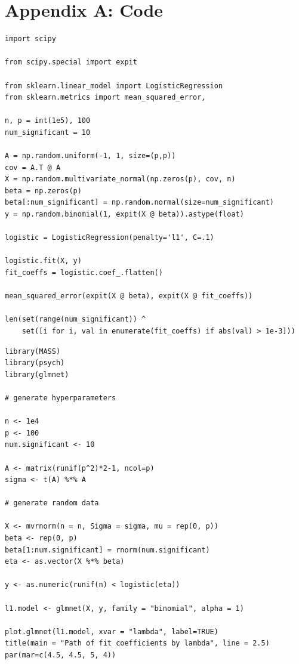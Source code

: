 \documentclass[letterpaper, 12pt]{article}
\begin{document}
\newpage

\section*{Appendix A: Code}

\begin{lstlisting}
import scipy

from scipy.special import expit

from sklearn.linear_model import LogisticRegression
from sklearn.metrics import mean_squared_error, 

n, p = int(1e5), 100
num_significant = 10

A = np.random.uniform(-1, 1, size=(p,p))
cov = A.T @ A
X = np.random.multivariate_normal(np.zeros(p), cov, n)
beta = np.zeros(p)
beta[:num_significant] = np.random.normal(size=num_significant)
y = np.random.binomial(1, expit(X @ beta)).astype(float)

logistic = LogisticRegression(penalty='l1', C=.1)

logistic.fit(X, y)
fit_coeffs = logistic.coef_.flatten()

mean_squared_error(expit(X @ beta), expit(X @ fit_coeffs))

len(set(range(num_significant)) ^ 
    set([i for i, val in enumerate(fit_coeffs) if abs(val) > 1e-3]))
\end{lstlisting}

\begin{lstlisting}
library(MASS)
library(psych)
library(glmnet)

# generate hyperparameters

n <- 1e4
p <- 100
num.significant <- 10

A <- matrix(runif(p^2)*2-1, ncol=p) 
sigma <- t(A) %*% A

# generate random data

X <- mvrnorm(n = n, Sigma = sigma, mu = rep(0, p))
beta <- rep(0, p)
beta[1:num.significant] = rnorm(num.significant)
eta <- as.vector(X %*% beta)

y <- as.numeric(runif(n) < logistic(eta))

l1.model <- glmnet(X, y, family = "binomial", alpha = 1)

plot.glmnet(l1.model, xvar = "lambda", label=TRUE)
title(main = "Path of fit coefficients by lambda", line = 2.5)
par(mar=c(4.5, 4.5, 5, 4))
\end{lstlisting}
\end{document}
